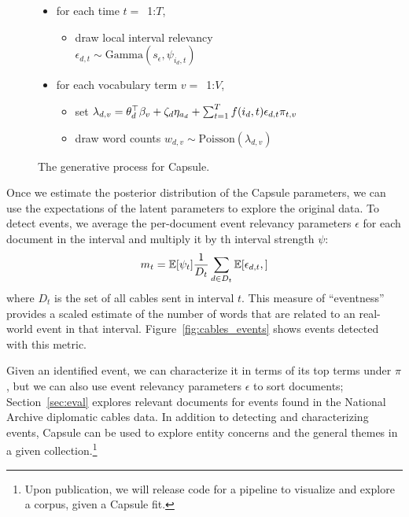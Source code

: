 \begin{figure}[htb]
\begin{mdframed}
\begin{itemize}[leftmargin=*]
\begin{itemize}[leftmargin=*]
\begin{itemize}[leftmargin=*]
		\end{itemize}
	\item for each time $t=$~1:$T$,
		\begin{itemize}[leftmargin=*]
			\item draw local interval relevancy \\$\epsilon_{d,t} \sim \mbox{Gamma}(s_\epsilon, \psi_{i_d,t})$ 
		\end{itemize}
	\item for each vocabulary term $v=$~1:$V$,
		\begin{itemize}[leftmargin=*]
			\item set $\lambda_{d,v} = \\ \theta_d^\top\beta_v  + \zeta_d \eta_{a_d} + \sum_{t=1}^T f(i_d, t) \epsilon_{d,t} \pi_{t,v}$
			\item draw word counts $w_{d,v} \sim \mbox{Poisson}\left(\lambda_{d,v}\right)$
		\end{itemize}
	\end{itemize}
\end{itemize}
\end{mdframed}
\caption{The generative process for Capsule.}
\label{fig:generative-model}
\end{figure}


Once we estimate the posterior distribution of the Capsule parameters, we can use the expectations of the latent parameters to explore the original data.  To detect events, we average the per-document event relevancy parameters $\epsilon$ for each document in the interval and multiply it by th interval strength $\psi$:
\begin{equation}
m_t = \mathbb{E}[\psi_t] \frac{1}{D_t} \sum_{d \in D_t} \mathbb{E}[\epsilon_{d,t},]
\label{eq:eventness}
\end{equation}
where $D_t$ is the set of all cables sent in interval $t$. This measure of ``eventness'' provides a scaled estimate of the number of words that are related to an real-world event in that interval.  Figure~\ref{fig:cables_events} shows events detected with this metric.

Given an identified event, we can characterize it in terms of its top terms under $\pi$, but we can also use event relevancy parameters $\epsilon$ to sort documents; Section~\ref{sec:eval} explores relevant documents for events found in the National Archive diplomatic cables data.
In addition to detecting and characterizing events, Capsule can be used to explore entity concerns and the general themes in a given collection.\footnote{Upon publication, we will release code for a pipeline to visualize and explore a corpus, given a Capsule fit.}

